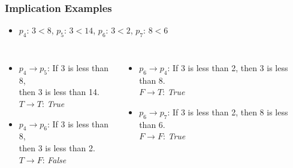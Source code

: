 \documentclass[dvipsnames]{beamer}
\begin{document}
\begin{frame}
  \frametitle{Implication Examples}

  \begin{example}
    \begin{itemize}
      \item $p_4$: $3<8$, $p_5$: $3<14$, $p_6$: $3<2$, $p_7$: $8<6$
    \end{itemize}

    \pause
    \begin{columns}[t]
        \begin{itemize}
          \item $p_4 \rightarrow p_5$: If 3 is less than 8,\\
            then 3 is less than 14.\\
            $T \rightarrow T$: \emph{True}
          \pause
          \item $p_4 \rightarrow p_6$: If 3 is less than 8,\\
            then 3 is less than 2.\\
            $T \rightarrow F$: \emph{False}
        \end{itemize}

      \pause
        \begin{itemize}
          \item $p_6 \rightarrow p_4$: If 3 is less than 2,
            then 3 is less than 8.\\
            $F \rightarrow T$: \emph{True}
          \pause
          \item $p_6 \rightarrow p_7$: If 3 is less than 2,
            then 8 is less than 6.\\
            $F \rightarrow F$: \emph{True}
        \end{itemize}
    \end{columns}
  \end{example}
\end{frame}
\end{document}
